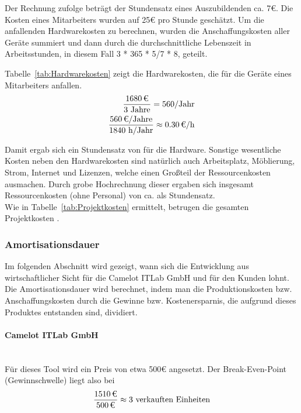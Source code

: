 Der Rechnung zufolge beträgt der Stundensatz eines Auszubildenden ca. 7€. Die Kosten eines Mitarbeiters wurden auf 25€ pro Stunde geschätzt. 
\newline
Um die anfallenden Hardwarekosten zu berechnen, wurden die Anschaffungskosten aller Geräte summiert und dann durch die durchschnittliche Lebenszeit in Arbeitsstunden, in diesem Fall 3 * 365 * 5/7 * 8, geteilt.
	
Tabelle~\ref{tab:Hardwarekosten} zeigt die Hardwarekosten, die für die Geräte eines Mitarbeiters anfallen.
\\

\begin{eqnarray}
	\frac{\eur{1680}}{3\mbox{ Jahre}} = 560 \mbox{/Jahr}\\
	\frac{\eur{560} \mbox{/Jahre}}{1840 \mbox{ h/Jahr}} \approx \eur{0.30}\mbox{/h}
\end{eqnarray}

Damit ergab sich ein Stundensatz von  für die Hardware.
\newline
Sonstige wesentliche Kosten neben den Hardwarekosten sind natürlich auch Arbeitsplatz, Möblierung, Strom, Internet und Lizenzen, welche einen Großteil der Ressourcenkosten ausmachen. Durch grobe Hochrechnung dieser ergaben sich insgesamt Ressourcenkosten (ohne Personal) von ca.  als Stundensatz.
\\
Wie in Tabelle~\ref{tab:Projektkosten} ermittelt, betrugen die gesamten Projektkosten .

\subsubsection{Amortisationsdauer}
\label{sec:Amortisationsdauer}
Im folgenden Abschnitt wird gezeigt, wann sich die Entwicklung aus wirtschaftlicher Sicht für die Camelot ITLab GmbH und für den Kunden lohnt. Die Amortisationsdauer wird berechnet, indem man die Produktionskosten bzw. Anschaffungskosten durch die Gewinne bzw. Kostenersparnis, die aufgrund dieses Produktes entstanden sind, dividiert.

\paragraph{Camelot ITLab GmbH}\mbox{} \\
Für dieses Tool wird ein Preis von etwa 500€ angesetzt. Der Break-Even-Point (Gewinnschwelle) liegt also bei
\begin{eqnarray}
\frac{\eur{1510}}{\eur{500}} \approx 3 \mbox{ verkauften Einheiten} 
\end{eqnarray}

